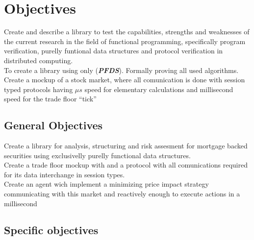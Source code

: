 \documentclass{tufte-book} %
\newcommand{\pfds}{\textbf{\textit{PFDS}}\xspace}
\begin{document}
\chapter{Objectives}


Create and describe a library to test the capabilities, strengths and weaknesses of the current research in the field of functional programming, specifically program verification, purelly funtional data structures and protocol verification in distributed computing.\\

To create a library using only (\pfds). Formally proving all used algorithms. \\
Create a mockup of a stock market, where all comunication is done with session typed protocols having ${\mu}s$ speed for elementary calculations and millisecond speed for the trade floor ``tick''

\section{General Objectives}

Create a library for analysis, structuring and risk assesment for mortgage backed securities using exclusivelly purelly functional data structures.\\

Create a trade floor mockup with and a protocol with all comunications required for its data interchange in session types. \\

Create an agent wich implement a minimizing price impact strategy communicating with this market and reactively enough to execute actions in a millisecond\\

\section{Specific objectives}


\backmatter




\end{document}
